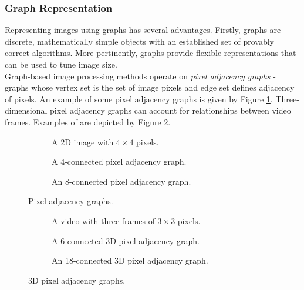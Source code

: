 \subsubsection{Graph Representation}
\label{sec:graphReps}
\indent \indent
Representing images using graphs has several advantages. Firstly, graphs are discrete, mathematically simple objects with an established set of provably correct algorithms. More pertinently, graphs provide flexible representations that can be used to tune image size.
\smallskip \\ \indent
Graph-based image processing methods operate on \textit{pixel adjacency graphs} - graphs whose vertex set is the set of image pixels and edge set defines adjacency of pixels. An example of some pixel adjacency graphs is given by Figure \ref{fig:pixelAdjacency}. Three-dimensional pixel adjacency graphs can account for relationships between video frames. Examples of are depicted by Figure \ref{fig:3dAdjacency}.
\begin{figure}[h!]
    \centering
    \begin{subfigure}[b]{0.29\textwidth}
        \centering
        \captionsetup{justification=centering}
        \scalebox{0.5}{}
        \caption{A 2D image with $4 \times 4$ pixels.}
    \end{subfigure} \hfill%
    \begin{subfigure}[b]{0.29\textwidth}
        \centering
        \captionsetup{justification=centering}
        \scalebox{0.5}{}
        \caption{A 4-connected pixel adjacency graph.}
    \end{subfigure} \hfill%
    \begin{subfigure}[b]{0.29\textwidth}
        \centering
        \captionsetup{justification=centering}
        \scalebox{0.5}{}
        \caption{An 8-connected pixel adjacency graph.}
    \end{subfigure}%
    \caption[Pixel Adjacency Graphs]{Pixel adjacency graphs.}
    \label{fig:pixelAdjacency}
\end{figure}
\begin{figure}[h!]
    \centering
    \begin{subfigure}[b]{0.29\textwidth}
        \centering
        \captionsetup{justification=centering}
        \scalebox{0.55}{}
        \caption{A video with three frames of $3 \times 3$ pixels.}
    \end{subfigure} \hfill%
    \begin{subfigure}[b]{0.29\textwidth}
        \centering
        \captionsetup{justification=centering}
        \scalebox{0.25}{}
        \caption{A 6-connected 3D pixel adjacency graph.}
    \end{subfigure} \hfill%
    \begin{subfigure}[b]{0.29\textwidth}
        \centering
        \captionsetup{justification=centering}
        \scalebox{0.25}{}
        \caption{An 18-connected 3D pixel adjacency graph.}
    \end{subfigure}%
    \caption[3D Pixel Adjacency Graphs]{3D pixel adjacency graphs.}
    \label{fig:3dAdjacency}
\end{figure}
